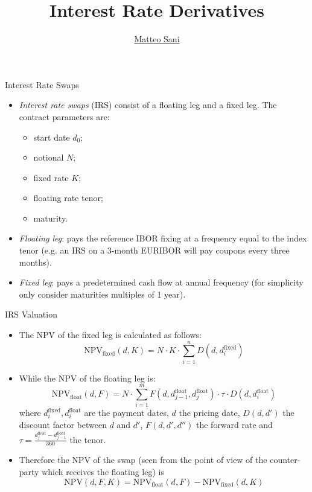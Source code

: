 \documentclass{beamer}
\title{Interest Rate Derivatives}
\author{\href{mailto:matteo.sani@unisi.it}{Matteo Sani}}
\begin{document}
\begin{frame}[plain]
	\maketitle
\end{frame}

\begin{frame}{Interest Rate Swaps}
	\begin{itemize}
		\item \emph{Interest rate swaps} (IRS) consist of a floating leg and a fixed leg. The contract parameters are:
		\begin{itemize}
		\item start date $d_0$;
		\item notional $N$;
		\item fixed rate $K$;
		\item floating rate tenor;
		\item maturity.
		\end{itemize}
		\item \emph{Floating leg}: pays the reference IBOR fixing at a frequency equal to the index tenor (e.g. an IRS on a 3-month EURIBOR will pay coupons every three months).
		\item \emph{Fixed leg}: pays a predetermined cash flow at annual frequency (for simplicity only consider maturities multiples of 1 year).
	\end{itemize}
\end{frame}

\begin{frame}{IRS Valuation}
	\begin{itemize}
		\item The NPV of the fixed leg is calculated as follows:
		\begin{equation*}
		\mathrm{NPV}_{\mathrm{fixed}}(d, K) = N\cdot K\cdot\sum_{i=1}^{n}D(d, d_{i}^{\mathrm{fixed}})
		\end{equation*}
		\item While the NPV of the floating leg is:
		\begin{equation*}
			\mathrm{NPV}_{\mathrm{float}}(d, F) = N\cdot\sum_{i=1}^{m}F(d, d_{j-1}^{\mathrm{float}}, d_{j}^{\mathrm{float}}) \cdot \tau
\cdot D(d, d_{i}^{\mathrm{float}})
		\end{equation*}
		where $d_i^{\mathrm{fixed}}, d_i^{\mathrm{float}}$ are the payment dates, $d$ the pricing date, $D(d, d')$ the discount factor between $d$ and $d'$, $F(d, d', d'')$ the forward rate and $\tau = \frac{d_{j}^{\mathrm{float}}-d_{j-1}^{\mathrm{float}}}{360}$ the tenor.		
		\item Therefore the NPV of the swap (seen from the point of view of the counter-party which receives the floating leg) is
		\begin{equation*}
			\mathrm{NPV}(d, F, K) = \mathrm{NPV}_{\mathrm{float}}(d,F) - \mathrm{NPV}_{\mathrm{fixed}}(d,K)
		\end{equation*} 
	\end{itemize}
\end{frame}
	
\end{document}
